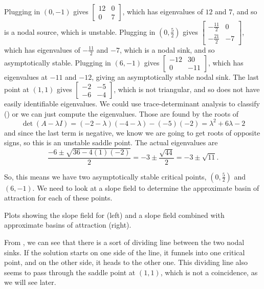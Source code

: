 \documentclass{ximera}
\begin{document}
\begin{exampleSol}
    Plugging in $(0,-1)$ gives 
    $\left[ \begin{smallmatrix} 12 & 0 \\ 0 & 7 \end{smallmatrix} \right]$, 
    which has eigenvalues of $12$ and $7$, and so is a nodal source, which is unstable. Plugging in  
    $\left(0, \frac{5}{2}\right)$ 
    gives 
    $\left[ \begin{smallmatrix} -\frac{11}{2} & 0 \\ -\frac{21}{2} & -7 \end{smallmatrix} \right]$, 
    which has eigenvalues of $-\frac{11}{2}$ and $-7$, which is a nodal sink, and so asymptotically stable. Plugging in $(6,-1)$ gives 
    $\left[ \begin{smallmatrix} -12 & 30 \\ 0 & -11 \end{smallmatrix} \right]$, 
    which has eigenvalues at $-11$ and $-12$, giving an asymptotically stable nodal sink. The last point at $(1,1)$ gives 
    $\left[ \begin{smallmatrix} -2 & -5 \\ -6 & -4 \end{smallmatrix} \right]$, 
    which is not triangular, and so does not have easily identifiable eigenvalues. We could use trace-determinant analysis to classify () or we can just compute the eigenvalues. Those are found by the roots of
    \begin{equation*}
        \det(A - \lambda I) = (-2-\lambda)(-4-\lambda) - (-5)(-2) = \lambda^2 + 6\lambda - 2
    \end{equation*}
    and since the last term is negative, we know we are going to get roots of opposite signs, so this is an unstable saddle point. The actual eigenvalues are
    \begin{equation*}
        \frac{-6 \pm \sqrt{36 - 4(1)(-2)}}{2} = -3 \pm \frac{\sqrt{44}}{2} = -3\pm\sqrt{11}.
    \end{equation*}
    
    So, this means we have two asymptotically stable critical points, $\left(0, \frac{5}{2}\right)$ and $(6, -1)$. We need to look at a slope field to determine the approximate basin of attraction for each of these points.
    
    \begin{myfig}
        \capstart
        \caption{Plots showing the slope field for  (left) and a slope field combined with approximate basins of attraction (right). \label{fig:BoAPlot}}
    \end{myfig}
    
    From , we can see that there is a sort of dividing line between the two nodal sinks. If the solution starts on one side of the line, it funnels into one critical point, and on the other side, it heads to the other one. This dividing line also seems to pass through the saddle point at $(1,1)$, which is not a coincidence, as we will see later. 
\end{exampleSol}
\end{document}
